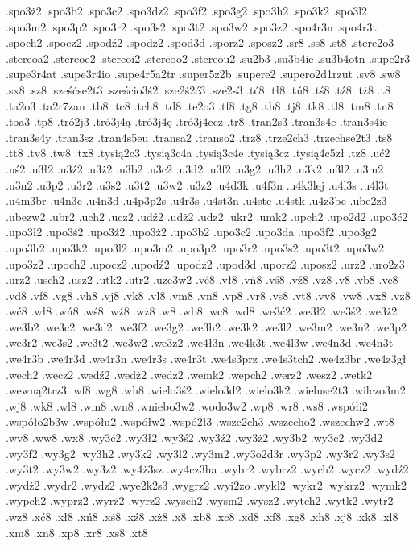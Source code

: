 {.spo3ż2
.spo3b2
.spo3c2
.spo3dz2
.spo3f2
.spo3g2
.spo3h2
.spo3k2
.spo3l2
.spo3m2
.spo3p2
.spo3r2
.spo3s2
.spo3t2
.spo3w2
.spo3z2
.spo4r3n
.spo4r3t
.spoch2
.spocz2
.spodź2
.spodż2
.spod3d
.sporz2
.sposz2
.sr8
.ss8
.st8
.stere2o3
.stereoa2
.stereoe2
.stereoi2
.stereoo2
.stereou2
.su2b3
.su3b4ie
.su3b4otn
.supe2r3
.supe3r4at
.supe3r4io
.supe4r5a2tr
.super5z2b
.supere2
.supero2d1rzut
.sv8
.sw8
.sx8
.sz8
.sześćse2t3
.sześcio3ś2
.sze2ś2ć3
.sze2s3
.tć8
.tł8
.tń8
.tś8
.tź8
.tż8
.t8
.ta2o3
.ta2r7zan
.tb8
.tc8
.tch8
.td8
.te2o3
.tf8
.tg8
.th8
.tj8
.tk8
.tl8
.tm8
.tn8
.toa3
.tp8
.tró2j3
.tró3j4ą
.tró3j4ę
.tró3j4ecz
.tr8
.tran2s3
.tran3s4e
.tran3s4ie
.tran3s4y
.tran3sz
.tran4s5eu
.transa2
.transo2
.trz8
.trze2ch3
.trzechse2t3
.ts8
.tt8
.tv8
.tw8
.tx8
.tysią2c3
.tysią3c4a
.tysią3c4e
.tysią3cz
.tysią4c5zł
.tz8
.uć2
.uś2
.u3ł2
.u3ź2
.u3ż2
.u3b2
.u3c2
.u3d2
.u3f2
.u3g2
.u3h2
.u3k2
.u3l2
.u3m2
.u3n2
.u3p2
.u3r2
.u3s2
.u3t2
.u3w2
.u3z2
.u4d3k
.u4f3n
.u4k3lej
.u4l3s
.u4l3t
.u4m3br
.u4n3c
.u4n3d
.u4p3p2s
.u4r3s
.u4st3n
.u4stc
.u4stk
.u4z3be
.ube2z3
.ubezw2
.ubr2
.uch2
.ucz2
.udź2
.udż2
.udz2
.ukr2
.umk2
.upch2
.upo2d2
.upo3ć2
.upo3ł2
.upo3ś2
.upo3ź2
.upo3ż2
.upo3b2
.upo3c2
.upo3da
.upo3f2
.upo3g2
.upo3h2
.upo3k2
.upo3l2
.upo3m2
.upo3p2
.upo3r2
.upo3s2
.upo3t2
.upo3w2
.upo3z2
.upoch2
.upocz2
.upodź2
.upodż2
.upod3d
.uporz2
.uposz2
.urż2
.uro2z3
.urz2
.usch2
.usz2
.utk2
.utr2
.uze3w2
.vć8
.vł8
.vń8
.vś8
.vź8
.vż8
.v8
.vb8
.vc8
.vd8
.vf8
.vg8
.vh8
.vj8
.vk8
.vl8
.vm8
.vn8
.vp8
.vr8
.vs8
.vt8
.vv8
.vw8
.vx8
.vz8
.wć8
.wł8
.wń8
.wś8
.wź8
.wż8
.w8
.wb8
.wc8
.wd8
.we3ć2
.we3ł2
.we3ś2
.we3ż2
.we3b2
.we3c2
.we3d2
.we3f2
.we3g2
.we3h2
.we3k2
.we3l2
.we3m2
.we3n2
.we3p2
.we3r2
.we3s2
.we3t2
.we3w2
.we3z2
.we4ł3n
.we4k3t
.we4l3w
.we4n3d
.we4n3t
.we4r3b
.we4r3d
.we4r3n
.we4r3s
.we4r3t
.we4s3prz
.we4s3tch2
.we4z3br
.we4z3gł
.wech2
.wecz2
.wedź2
.wedż2
.wedz2
.wemk2
.wepch2
.werz2
.wesz2
.wetk2
.wewną2trz3
.wf8
.wg8
.wh8
.wielo3ś2
.wielo3d2
.wielo3k2
.wieluse2t3
.wilczo3m2
.wj8
.wk8
.wl8
.wm8
.wn8
.wniebo3w2
.wodo3w2
.wp8
.wr8
.ws8
.współi2
.współo2b3w
.współu2
.współw2
.wspó2ł3
.wsze2ch3
.wszecho2
.wszechw2
.wt8
.wv8
.ww8
.wx8
.wy3ć2
.wy3ł2
.wy3ś2
.wy3ź2
.wy3ż2
.wy3b2
.wy3c2
.wy3d2
.wy3f2
.wy3g2
.wy3h2
.wy3k2
.wy3l2
.wy3m2
.wy3o2d3r
.wy3p2
.wy3r2
.wy3s2
.wy3t2
.wy3w2
.wy3z2
.wy4ż3sz
.wy4cz3ha
.wybr2
.wybrz2
.wych2
.wycz2
.wydź2
.wydż2
.wydr2
.wydz2
.wye2k2s3
.wygrz2
.wyi2zo
.wykl2
.wykr2
.wykrz2
.wymk2
.wypch2
.wyprz2
.wyrż2
.wyrz2
.wysch2
.wysm2
.wysz2
.wytch2
.wytk2
.wytr2
.wz8
.xć8
.xł8
.xń8
.xś8
.xź8
.xż8
.x8
.xb8
.xc8
.xd8
.xf8
.xg8
.xh8
.xj8
.xk8
.xl8
.xm8
.xn8
.xp8
.xr8
.xs8
.xt8
}
